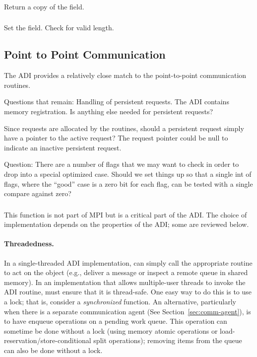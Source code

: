 \documentclass{article}
\begin{document}
\subsubsection{}
Return a copy of the  field.

\subsubsection{}
Set the  field.  Check for valid length.

\subsection{Point to Point Communication}
\label{sec:pt-2-pt}

The ADI provides a relatively close match to the point-to-point
communication routines.  

Questions that remain:  Handling of persistent requests.  The ADI
contains memory registration.  Is anything else needed for persistent
requests? 

Since requests are allocated by the  routines,
should a persistent request simply have a pointer to the active request?  The
request pointer could be null to indicate an inactive persistent request.

Question:  There are a number of flags that we may want to check in order to
drop into a special optimized case.  Should we set things up so that a single
int of flags, where the ``good'' case is a zero bit for each flag, can be
tested with a single compare against zero?

\subsubsection{}
This function is not part of MPI but is a critical part of the ADI.
The choice of implementation depends on the properties of the ADI;
some are reviewed below.

\paragraph{Threadedness.}In a single-threaded ADI
implementation, 
 can simply call the appropriate routine to act on
the object (e.g., deliver a message or inspect a remote queue in
shared memory).  In an implementation that allows multiple-user
threads to invoke the ADI routine,  must ensure
that it is thread-safe.  One easy way to do this is to use a lock;
that is, consider  a \emph{synchronized}
function.  An alternative, particularly when there is a separate
communication agent (See Section~\ref{sec:comm-agent}), is to have
 enqueue operations on a pending work queue.  This
operation can sometime be done without a lock (using memory atomic
operations or load-reservation/store-conditional split operations);
removing items from the queue can also be done without a lock.
\end{document}
